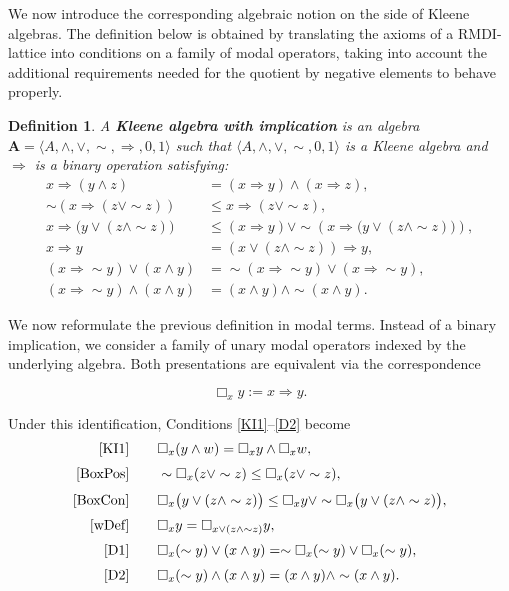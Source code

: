 \documentclass[10pt,a4paper]{amsart}
\newtheorem{definition}[theorem]{Definition}
\newcommand{\A}{\mathbf{A}}
\begin{document}
We now introduce the corresponding algebraic notion on the side of Kleene algebras. The definition below
is obtained by translating the axioms of a $\mathrm{RMDI}$-lattice into conditions on a family of modal
operators, taking into account the additional requirements needed for the quotient by negative elements to behave properly.

\begin{definition}
A \textbf{Kleene algebra with implication} is an algebra $\A=\langle A,\wedge,\vee,\sim,\Rightarrow,0,1\rangle$ such that $\langle A,\wedge,\vee,\sim,0,1\rangle$ is a Kleene algebra and $\Rightarrow$ is a binary operation satisfying: 
\begin{align}
x\Rightarrow(y\wedge z)
&=(x\Rightarrow y)\wedge(x\Rightarrow z),
\tag{KI1}\label{KI1}\\
\sim(x\Rightarrow(z\vee\sim z))
&\le x\Rightarrow(z\vee\sim z),
\tag{BoxPos}\label{BoxPos}\\
x\Rightarrow\bigl(y\vee(z\wedge\sim z)\bigr)
&\le (x\Rightarrow y)\vee
\sim\!\left(x\Rightarrow\bigl(y\vee(z\wedge\sim z)\bigr)\right),
\tag{BoxCon}\label{BoxCon}\\
x\Rightarrow y
&=(x\vee(z\wedge\sim z))\Rightarrow y,
\tag{wDef}\label{wDef}\\
(x\Rightarrow\sim y)\vee(x\wedge y)
&=\sim(x\Rightarrow\sim y)\vee(x\Rightarrow\sim y),
\tag{D1}\label{D1}\\
(x\Rightarrow\sim y)\wedge(x\wedge y)
&=(x\wedge y)\wedge\sim(x\wedge y).
\tag{D2}\label{D2}
\end{align}
    
\end{definition}

We now reformulate the previous definition in modal terms. Instead of a binary implication, we consider a family of unary modal operators indexed by the underlying algebra. Both presentations are equivalent via the correspondence

\[
\Box_x y:=x\Rightarrow y.
\]

Under this identification, Conditions \eqref{KI1}--\eqref{D2} become
\[
\begin{aligned}
\eqref{KI1}\qquad
&\Box_x(y \wedge w)
= \Box_x y \wedge \Box_x w,\\[1mm]
\eqref{BoxPos}\qquad
&\sim \Box_x (z \vee \sim z)
\leq \Box_x (z \vee \sim z),\\[1mm]
\eqref{BoxCon}\qquad
&\Box_x \bigl(y \vee (z \wedge \sim z)\bigr)
\leq \Box_x y \vee
\sim \Box_x \bigl(y \vee (z \wedge \sim z)\bigr),\\[1mm]
\eqref{wDef}\qquad
&\Box_x y
=\Box_{x\vee(z\wedge\sim z)}y,\\[1mm]
\eqref{D1}\qquad
&\Box_x(\sim y)\vee (x\wedge y)
=\sim \Box_x(\sim y)\vee \Box_x(\sim y),\\[1mm]
\eqref{D2}\qquad
&\Box_x(\sim y)\wedge (x\wedge y)
=(x\wedge y)\wedge \sim (x\wedge y).
\end{aligned}
\]
\end{document}
